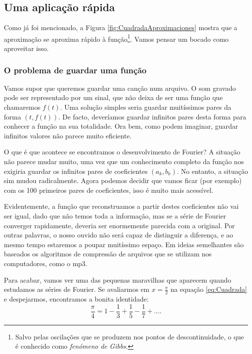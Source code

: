 \subsection{Uma aplicação rápida}
Como já foi mencionado, a Figura \ref{fig:CuadradaAproximaciones} mostra que a aproximação se aproxima rápido à função\footnote{Salvo pelas oscilações que se produzem nos pontos de descontinuidade, o que é conhecido como \textit{fenómeno de Gibbs}.}. Vamos pensar um bocado como aproveitar isso.

\subsubsection*{O problema de guardar uma função}
Vamos supor que queremos guardar uma canção num arquivo. O som gravado pode ser representado por um sinal, que não deixa de ser uma função que chamaremos $f(t)$. Uma solução simples seria guardar muitíssimos pares da forma $(t, f(t))$. De facto, deveríamos guardar infinitos pares desta forma para conhecer a função na sua totalidade. Ora bem, como podem imaginar, guardar infinitos valores não parece muito eficiente.

O que é que acontece se encontramos o desenvolvimento de Fourier? A situação não parece mudar muito, uma vez que um conhecimento completo da função nos exigiria guardar os infinitos pares de coeficientes $(a_k, b_k)$. No entanto, a situação sim mudou radicalmente. Agora podemos decidir que vamos ficar (por exemplo) com os 100 primeiros pares de coeficientes, isso é muito mais acessível.

Evidentemente, a função que reconstruamos a partir destes coeficientes não vai ser igual, dado que não temos toda a informação, mas se a série de Fourier converger rapidamente, deveria ser enormemente parecida com a original. Por outras palavras, o nosso ouvido não será capaz de distinguir a diferença, e ao mesmo tempo estaremos a poupar muitíssimo espaço. Em ideias semelhantes são baseados os algoritmos de compressão de arquivos que se utilizam nos computadores, como o mp3.

\begin{mybox}
  Para acabar, vamos ver uma das pequenas maravilhas que aparecem quando estudamos as séries de Fourier. Se avaliarmos em $x=\frac{\pi}{2}$ na equação \eqref{eq:Cuadrada} e despejarmos, encontramos a bonita identidade:
  \[
    \frac{\pi}{4} = 1 - \frac{1}{3} + \frac{1}{5} - \frac{1}{7} + \ldots .
  \]
\end{mybox}

